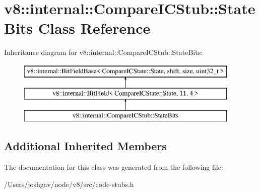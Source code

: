 \hypertarget{classv8_1_1internal_1_1_compare_i_c_stub_1_1_state_bits}{}\section{v8\+:\+:internal\+:\+:Compare\+I\+C\+Stub\+:\+:State\+Bits Class Reference}
\label{classv8_1_1internal_1_1_compare_i_c_stub_1_1_state_bits}
Inheritance diagram for v8\+:\+:internal\+:\+:Compare\+I\+C\+Stub\+:\+:State\+Bits\+:\begin{figure}[H]
\begin{center}
\leavevmode
\includegraphics[height=3.000000cm]{classv8_1_1internal_1_1_compare_i_c_stub_1_1_state_bits}
\end{center}
\end{figure}
\subsection*{Additional Inherited Members}


The documentation for this class was generated from the following file\+:\begin{DoxyCompactItemize}
\item 
/\+Users/joshgav/node/v8/src/code-\/stubs.\+h\end{DoxyCompactItemize}
